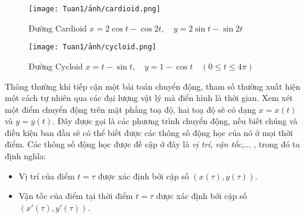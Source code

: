 \begin{figure}[H]
    \centering
    \texttt{[image: Tuan1/ảnh/cardioid.png]}
    \caption{Đường Cardioid\newline \hspace*{1em} $x = 2\cos t - \cos 2t,\quad y = 2\sin t - \sin 2t$}
\end{figure}

\begin{figure}[H]
    \centering
    \texttt{[image: Tuan1/ảnh/cycloid.png]}
    \caption{Đường Cycloid\newline \hspace*{1em} $x=t-\sin t,\quad y=1-\cos t\quad (0\leq t\leq 4\pi)$}
\end{figure}

Thông thường khi tiếp cận một bài toán chuyển động, tham số thường xuất hiện một cách tự nhiên qua các đại lượng vật lý mà điển hình là thời gian.\newline
Xem xét một điểm chuyển động trên mặt phẳng toạ độ,  hai toạ độ sẽ có dạng $x=x(t)$ và $y=y(t)$. Đây được gọi là các phương trình chuyển động, nếu biết chúng và điều kiện ban đầu sẽ có thể biết được các thông số động học của nó ở mọi thời điểm. Các thông số động học được đề cập ở đây là \emph{vị trí}, \emph{vận tốc},... , trong đó ta định nghĩa:
\begin{itemize}
    \item Vị trí của điểm $t=\tau$ được xác định bởi cặp số $(x(\tau),y(\tau))$.
    \item Vận tốc của điểm tại thời điểm $t=\tau$ được xác định bởi cặp số $(x'(\tau),y'(\tau))$.
\end{itemize}
